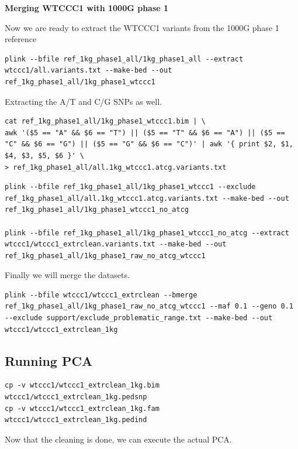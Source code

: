\documentclass[
]{book}
\begin{document}
\textbf{Merging WTCCC1 with 1000G phase 1}

Now we are ready to extract the WTCCC1 variants from the 1000G phase 1 reference

\begin{lstlisting}
plink --bfile ref_1kg_phase1_all/1kg_phase1_all --extract wtccc1/all.variants.txt --make-bed --out ref_1kg_phase1_all/1kg_phase1_wtccc1
\end{lstlisting}

Extracting the A/T and C/G SNPs as well.

\begin{lstlisting}
cat ref_1kg_phase1_all/1kg_phase1_wtccc1.bim | \
awk '($5 == "A" && $6 == "T") || ($5 == "T" && $6 == "A") || ($5 == "C" && $6 == "G") || ($5 == "G" && $6 == "C")' | awk '{ print $2, $1, $4, $3, $5, $6 }' \
> ref_1kg_phase1_all/all.1kg_wtccc1.atcg.variants.txt
\end{lstlisting}

\begin{lstlisting}
plink --bfile ref_1kg_phase1_all/1kg_phase1_wtccc1 --exclude ref_1kg_phase1_all/all.1kg_wtccc1.atcg.variants.txt --make-bed --out ref_1kg_phase1_all/1kg_phase1_wtccc1_no_atcg

plink --bfile ref_1kg_phase1_all/1kg_phase1_wtccc1_no_atcg --extract wtccc1/wtccc1_extrclean.variants.txt --make-bed --out ref_1kg_phase1_all/1kg_phase1_raw_no_atcg_wtccc1
\end{lstlisting}

Finally we will merge the datasets.

\begin{lstlisting}
plink --bfile wtccc1/wtccc1_extrclean --bmerge ref_1kg_phase1_all/1kg_phase1_raw_no_atcg_wtccc1 --maf 0.1 --geno 0.1 --exclude support/exclude_problematic_range.txt --make-bed --out wtccc1/wtccc1_extrclean_1kg
\end{lstlisting}

\hypertarget{running-pca}{%
\subsection{Running PCA}\label{running-pca}}

\begin{lstlisting}
cp -v wtccc1/wtccc1_extrclean_1kg.bim wtccc1/wtccc1_extrclean_1kg.pedsnp
cp -v wtccc1/wtccc1_extrclean_1kg.fam wtccc1/wtccc1_extrclean_1kg.pedind
\end{lstlisting}

Now that the cleaning is done, we can execute the actual PCA.
\end{document}
